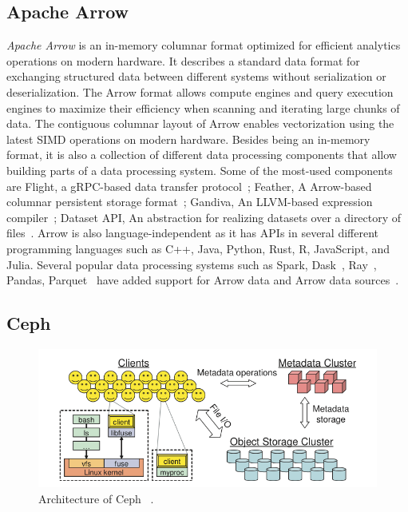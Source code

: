 \documentclass[11pt]{article}
\begin{document}
\subsection{Apache Arrow}
\textit{Apache Arrow} is an in-memory columnar format optimized for efficient analytics operations on modern hardware. It describes a standard data format for exchanging structured data between different systems without serialization or deserialization. The Arrow format allows compute engines and query execution engines to maximize their efficiency when scanning and iterating large chunks of data. The contiguous columnar layout of Arrow enables vectorization using the latest SIMD operations on modern hardware. Besides being an in-memory format, it is also a collection of different data processing components that allow building parts of a data processing system. Some of the most-used components are Flight, a gRPC-based data transfer protocol~\cite{flight}; Feather, A Arrow-based columnar persistent storage format~\cite{feather}; Gandiva, An LLVM-based expression compiler~\cite{gandiva}; Dataset API, An abstraction for realizing datasets over a directory of files~\cite{ArrowDatasetDocs}. Arrow is also language-independent as it has APIs in several different programming languages such as C++, Java, Python, Rust, R, JavaScript, and Julia. Several popular data processing systems such as Spark, Dask~\cite{Dask}, Ray~\cite{Ray}, Pandas, Parquet~\cite{parquet} have added support for Arrow data and Arrow data sources~\cite{jc2022skyhook}.

\subsection{Ceph}
\begin{figure}[h]
\centering
\includegraphics[width=\textwidth]{figs/cepharch.png}
\caption{Architecture of Ceph ~\cite{weil2006ceph}.}
\label{fig:ceph-arch}
\end{figure}
\end{document}
